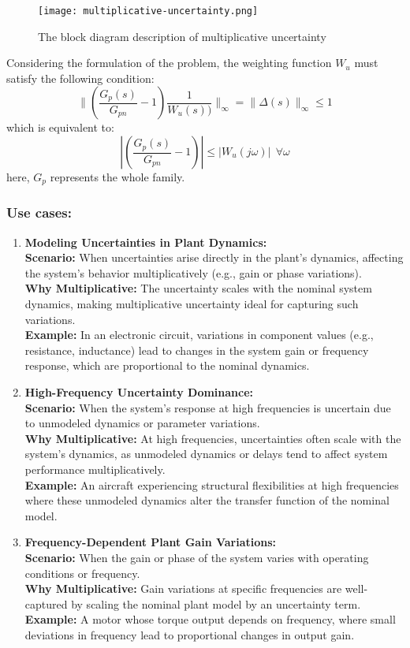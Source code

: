 \begin{figure}[H]
    \centering
    \texttt{[image: multiplicative-uncertainty.png]}
    \caption{The block diagram description of multiplicative uncertainty}
\end{figure}
Considering the formulation of the problem, the weighting function $W_u$ must satisfy the following condition:
\[
\|(\frac{G_p(s)}{G_{pn}}-1)\frac{1}{W_u(s))}\|_\infty = \|\Delta(s)\|_\infty \leq 1
\]
which is equivalent to:
\[
|(\frac{G_p(s)}{G_{pn}}-1)| \leq |W_u(j\omega)| \:\: \forall \omega
\]
here, $G_p$ represents the whole family.
\subsubsection{Use cases:}
\begin{enumerate}
    \item \textbf{Modeling Uncertainties in Plant Dynamics:}\\
    \textbf{Scenario:} When uncertainties arise directly in the plant's dynamics, affecting the system’s behavior multiplicatively (e.g., gain or phase variations).\\
    \textbf{Why Multiplicative:} The uncertainty scales with the nominal system dynamics, making multiplicative uncertainty ideal for capturing such variations.\\
    \textbf{Example:} In an electronic circuit, variations in component values (e.g., resistance, inductance) lead to changes in the system gain or frequency response, which are proportional to the nominal dynamics.

    \item \textbf{High-Frequency Uncertainty Dominance:}\\
    \textbf{Scenario:} When the system’s response at high frequencies is uncertain due to unmodeled dynamics or parameter variations.\\
    \textbf{Why Multiplicative:} At high frequencies, uncertainties often scale with the system's dynamics, as unmodeled dynamics or delays tend to affect system performance multiplicatively.\\
    \textbf{Example:} An aircraft experiencing structural flexibilities at high frequencies where these unmodeled dynamics alter the transfer function of the nominal model.

    \item \textbf{Frequency-Dependent Plant Gain Variations:}\\
    \textbf{Scenario:} When the gain or phase of the system varies with operating conditions or frequency.\\
    \textbf{Why Multiplicative:} Gain variations at specific frequencies are well-captured by scaling the nominal plant model by an uncertainty term.\\
    \textbf{Example:} A motor whose torque output depends on frequency, where small deviations in frequency lead to proportional changes in output gain.


\end{enumerate}
